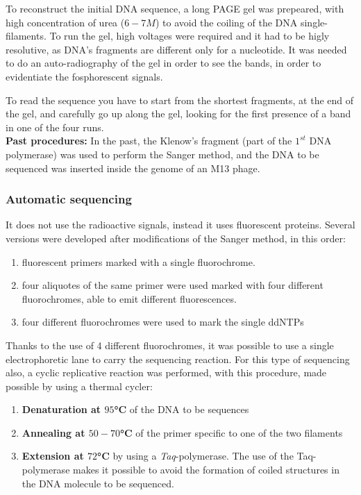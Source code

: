 To reconstruct the initial DNA sequence, a long PAGE gel was prepeared, with high concentration of urea ($6 - 7 M$) to avoid the coiling of the DNA single-filaments. To run the gel, high voltages were required and it had to be higly resolutive, as DNA's fragments are different only for a nucleotide. It was needed to do an auto-radiography of the gel in order to see the bands, in order to evidentiate the fosphorescent signals.

To read the sequence you have to start from the shortest fragments, at the end of the gel, and carefully go up along the gel, looking for the first presence of a band in one of the four runs. \\

\textbf{Past procedures: }In the past, the Klenow's fragment (part of the $1^{st}$ DNA polymerase) was used to perform the Sanger method, and the DNA to be sequenced was inserted inside the genome of an M13 phage.


\subsubsection{Automatic sequencing}
It does not use the radioactive signals, instead it uses fluorescent proteins. Several versions were developed after modifications of the Sanger method, in this order:

\begin{enumerate}
	\item fluorescent primers marked with a single fluorochrome.
	\item four aliquotes of the same primer were used marked with four different fluorochromes, able to emit different fluorescences.
	\item four different fluorochromes were used to mark the single ddNTPs
\end{enumerate}

Thanks to the use of 4 different fluorochromes, it was possible to use a single electrophoretic lane to carry the sequencing reaction. For this type of sequencing also, a cyclic replicative reaction was performed, with this procedure, made possible by using a thermal cycler:

\begin{enumerate}
	\item \textbf{Denaturation at $95$°C} of the DNA to be sequences
	\item \textbf{Annealing at $50-70$°C} of the primer specific to one of the two filaments 
	\item \textbf{Extension at $72$°C} by using a \textit{Taq}-polymerase. The use of the Taq-polymerase makes it possible to avoid the formation of coiled structures in the DNA molecule to be sequenced.
\end{enumerate}

